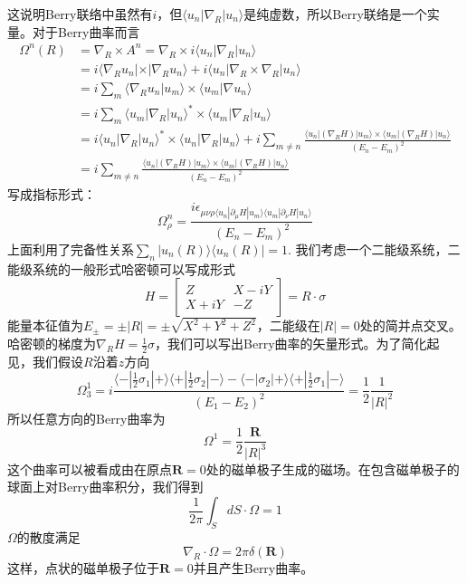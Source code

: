 \documentclass{article}
\numberwithin{equation}{subsection}
\begin{document}
这说明Berry联络中虽然有$i$，但$\langle u_n|\nabla_R|u_n\rangle$是纯虚数，所以Berry联络是一个实量。对于Berry曲率而言
\begin{equation}
    \begin{split}
        \Omega^n(R)&=\nabla_R\times A^n=\nabla_R\times i\langle u_n|\nabla_R|u_n\rangle\\
        &=i\langle\nabla_Ru_n|\times|\nabla_Ru_n\rangle+i\langle u_n|\nabla_R\times\nabla_R|u_n\rangle\\
        &=i\sum_m\langle\nabla_R u_n|u_m\rangle\times\langle u_m|\nabla u_n\rangle\\
        &=i\sum_m\langle u_m|\nabla_R|u_n\rangle^*\times\langle u_m|\nabla_R|u_n\rangle\\
        &=i\langle u_n|\nabla_R|u_n\rangle^*\times\langle u_n|\nabla_R|u_n\rangle+i\sum_{m\neq n}\frac{\langle u_n|(\nabla_RH)|u_m\rangle\times\langle u_m|(\nabla_RH)|u_n\rangle}{(E_n-E_m)^2}\\
        &=i\sum_{m\neq n}\frac{\langle u_n|(\nabla_RH)|u_m\rangle\times\langle u_m|(\nabla_RH)|u_n\rangle}{(E_n-E_m)^2}
    \end{split}
\end{equation}
写成指标形式：
\begin{equation}
    \Omega_\rho^n=\frac{i\epsilon_{\mu\nu\rho\langle u_n|\partial_\mu H|u_m\rangle\langle u_m|\partial_\nu H|u_n\rangle}}{(E_n-E_m)^2}
\end{equation}
上面利用了完备性关系$\sum_n|u_n(R)\rangle\langle u_n(R)|=1$. 我们考虑一个二能级系统，二能级系统的一般形式哈密顿可以写成形式
\begin{equation}
    H=\begin{bmatrix}
        Z&X-iY\\
        X+iY&-Z
    \end{bmatrix}=R\cdot\sigma
\end{equation}
能量本征值为$E_\pm=\pm|R|=\pm\sqrt{X^2+Y^2+Z^2}$，二能级在$|R|=0$处的简并点交叉。哈密顿的梯度为$\nabla_RH=\frac{1}{2}\sigma$，我们可以写出Berry曲率的矢量形式。为了简化起见，我们假设$R$沿着$z$方向
\begin{equation}
    \Omega_3^1=i\frac{\langle-|\frac{1}{2}\sigma_1|+\rangle\langle+|\frac{1}{2}\sigma_2|-\rangle-\langle-|\sigma_2|+\rangle\langle+|\frac{1}{2}\sigma_1|-\rangle}{(E_1-E_2)^2}=\frac{1}{2}\frac{1}{|R|^2}
\end{equation}
所以任意方向的Berry曲率为
\begin{equation}
    \Omega^1=\frac{1}{2}\frac{\mathbf{R}}{|R|^3}
\end{equation}
这个曲率可以被看成由在原点$\mathbf{R}=0$处的磁单极子生成的磁场。在包含磁单极子的球面上对Berry曲率积分，我们得到
\begin{equation}
    \frac{1}{2\pi}\int_S dS\cdot\Omega=1
\end{equation}
$\Omega$的散度满足
\begin{equation}
    \nabla_R\cdot\Omega=2\pi\delta(\mathbf{R})
\end{equation}
这样，点状的磁单极子位于$\mathbf{R}=0$并且产生Berry曲率。
\end{document}
